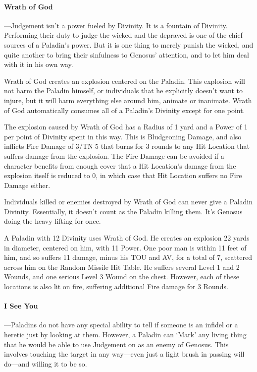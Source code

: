 \documentclass[oneside,11pt,english]{book}
\begin{document}
\paragraph{Wrath of God}
---\quad Judgement isn't a power fueled by Divinity. It is a fountain of Divinity. Performing their duty to 
judge the wicked and the depraved is one of the chief sources of a Paladin's power. But it is one 
thing to merely punish the wicked, and quite another to bring their sinfulness to Genosus’ 
attention, and to let him deal with it in his own way. 


Wrath of God creates an explosion centered on the Paladin. This explosion will not harm the 
Paladin himself, or individuals that he explicitly doesn't want to injure, but it will harm 
everything else around him, animate or inanimate. Wrath of God automatically consumes all of a 
Paladin's Divinity except for one point. 


The explosion caused by Wrath of God has a Radius of 1 yard and a Power of 1 per point of 
Divinity spent in this way. This is Bludgeoning Damage, and also inflicts Fire Damage of 3/TN 5 
that burns for 3 rounds to any Hit Location that suffers damage from the explosion. The Fire 
Damage can be avoided if a character benefits from enough cover that a Hit Location's damage 
from the explosion itself is reduced to 0, in which case that Hit Location suffers no Fire Damage 
either. 


Individuals killed or enemies destroyed by Wrath of God can never give a Paladin Divinity. 
Essentially, it doesn't count as the Paladin killing them. It's Genosus doing the heavy lifting for 
once. 


A Paladin with 12 Divinity uses Wrath of God. He creates an explosion 22 yards in diameter, centered on him, with 11 
Power. One poor man is within 11 feet of him, and so suffers 11 damage, minus his TOU and AV, for a total of 7, 
scattered across him on the Random Missile Hit Table. He suffers several Level 1 and 2 Wounds, and one serious Level 
3 Wound on the chest. However, each of these locations is also lit on fire, suffering additional Fire damage for 3 
Rounds. 

\paragraph{I See You}
---\quad Paladins do not have any special ability to tell if someone is an infidel or a heretic just by looking 
at them. However, a Paladin can ‘Mark’ any living thing that he would be able to use Judgement 
on as an enemy of Genosus. This involves touching the target in any way—even just a light brush in passing will do—and willing it to be so.
\end{document}
